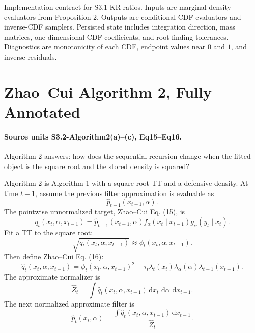 \documentclass[11pt]{article}
\newcommand{\dd}{\,\mathrm d}
\begin{document}
Implementation contract for S3.1-KR-ratios.  Inputs are marginal density
evaluators from Proposition 2.  Outputs are conditional CDF evaluators and
inverse-CDF samplers.  Persisted state includes integration direction, mass
matrices, one-dimensional CDF coefficients, and root-finding tolerances.
Diagnostics are monotonicity of each CDF, endpoint values near \(0\) and \(1\),
and inverse residuals.

\begin{center}
\end{center}

\section{Zhao--Cui Algorithm 2, Fully Annotated}

\paragraph{Source units S3.2-Algorithm2(a)--(c), Eq15--Eq16.}
Algorithm 2 answers: how does the sequential recursion change when the fitted
object is the square root and the stored density is squared?

Algorithm 2 is Algorithm 1 with a square-root TT and a defensive density.
At time \(t-1\), assume the previous filter approximation is evaluable as
\[
    \widehat p_{t-1}(x_{t-1},\alpha).
\]
The pointwise unnormalized target, Zhao--Cui Eq. (15), is
\[
    q_t(x_t,\alpha,x_{t-1})
    =
    \widehat p_{t-1}(x_{t-1},\alpha)
    f_\alpha(x_t\mid x_{t-1})
    g_\alpha(y_t\mid x_t).
    \tag{A2-1}
\]
Fit a TT to the square root:
\[
    \sqrt{q_t(x_t,\alpha,x_{t-1})}
    \approx
    \phi_t(x_t,\alpha,x_{t-1}).
    \tag{A2-2}
\]
Then define Zhao--Cui Eq. (16):
\[
    \widehat q_t(x_t,\alpha,x_{t-1})
    =
    \phi_t(x_t,\alpha,x_{t-1})^2
    +
    \tau_t\lambda_t(x_t)\lambda_\alpha(\alpha)\lambda_{t-1}(x_{t-1}).
    \tag{A2-3}
\]
The approximate normalizer is
\[
    \widehat Z_t
    =
    \int \widehat q_t(x_t,\alpha,x_{t-1})
    \dd x_t\,\dd\alpha\,\dd x_{t-1}.
    \tag{A2-4}
\]
The next normalized approximate filter is
\[
    \widehat p_t(x_t,\alpha)
    =
    \frac{\int \widehat q_t(x_t,\alpha,x_{t-1})\dd x_{t-1}}
    {\widehat Z_t}.
    \tag{A2-5}
\]
\end{document}
